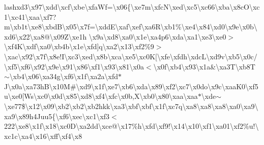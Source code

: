 lash{}xd3\textbackslash{}x97\textbackslash{}xdd\textbackslash{}xcf\textbackslash{}xbe\textbackslash{}xfa\+Wf=\textbackslash{}x06\{\textbackslash{}xe7m\textbackslash{}xfc\+N\textbackslash{}xed\textbackslash{}xc5\textbackslash{}xc66\textbackslash{}xba\textbackslash{}x8c\+O\textbackslash{}xc1\textbackslash{}xc41\textbackslash{}xaa\textbackslash{}xf7?m\textbackslash{}xb1t\textbackslash{}xe8\textbackslash{}xbd\+B\textbackslash{}x05\textbackslash{}x7f=\textbackslash{}xdd\+E\textbackslash{}xaf\textbackslash{}xef\textbackslash{}xa6\+R\textbackslash{}xb1\%\textbackslash{}xe4\textbackslash{}x84\textbackslash{}xd0\textbackslash{}x9e\textbackslash{}x0b\textbackslash{}xd6\textbackslash{}x22\textbackslash{}xa8@\textbackslash{}x09\+Z\textbackslash{}xe1h\textquotesingle{} \textbackslash{}x9a\textbackslash{}xd8\textbackslash{}xa0\textbackslash{}x1e\textbackslash{}xa4p6\textbackslash{}xda\textbackslash{}xa1\textbackslash{}xe3\textbackslash{}xe0$>$\textbackslash{}xf4\+K\textbackslash{}xdf\textbackslash{}xa0\textbackslash{}xb4b\textbackslash{}x1e\textbackslash{}xfd\mbox{]}q\textbackslash{}xa2\textbackslash{}x13\textbackslash{}xf2\%9$>$\textbackslash{}xac\textbackslash{}x92\textbackslash{}x7f\textbackslash{}x8e!\+I\textbackslash{}xc3\textbackslash{}xed\textbackslash{}x8b\textbackslash{}xca\textbackslash{}xe5\textbackslash{}xc0\+K\mbox{[}\textbackslash{}xfe\textbackslash{}xfdh\textbackslash{}xdc\+L\textbackslash{}xd9v\textbackslash{}xb5\textbackslash{}x0c/\textbackslash{}xf5\textbackslash{}xf6\textbackslash{}x92\textbackslash{}x9e\textbackslash{}x91\textbackslash{}x86\textbackslash{}xf1\textbackslash{}x93\textbackslash{}x81\textbackslash{}x0a$<$\textbackslash{}x0f\textbackslash{}xb4\textbackslash{}x93\textbackslash{}x1a\&\textbackslash{}xa3\+T\textbackslash{}xb8\+T$\sim$\textbackslash{}xb4\textbackslash{}x06\textbackslash{}xa34g\textbackslash{}xf6\textbackslash{}x1f\textbackslash{}xa2a\textbackslash{}xfd$\ast$\+J\textbackslash{}x0a\textbackslash{}xa73h\+B\textbackslash{}x10\+M\#\textbackslash{}xd9\textbackslash{}x1f\textbackslash{}xe7\textbackslash{}xb6\textbackslash{}xda\textbackslash{}x89\textbackslash{}xf2\textbackslash{}xc7\textbackslash{}x0do\textbackslash{}x9c\textbackslash{}xaa\+K0\textbackslash{}xf5u\textbackslash{}xe0\mbox{[}\+Ws\textbackslash{}xc0\textbackslash{}x0d\textbackslash{}x85\textbackslash{}xd8\textbackslash{}xf4\textbackslash{}xfc\textbackslash{}x0b,\+X\textbackslash{}xb0\textbackslash{}x80\textbackslash{}xaa\textbackslash{}xaa$\ast$\textbackslash{}xde$\sim$\textbackslash{}xe77\$\textbackslash{}x12\textbackslash{}x09\textbackslash{}xb2\textbackslash{}xb2\textbackslash{}xb2hkk\textbackslash{}xa3\textbackslash{}xbf\textbackslash{}xbf\textbackslash{}x1f\textbackslash{}xc7q\textbackslash{}xa8\textbackslash{}xa8\textbackslash{}xa8\textbackslash{}xa0\textbackslash{}xa9\textbackslash{}xa9\textbackslash{}x89h4\+Juu5\{\textbackslash{}xf6\textbackslash{}xec\textbackslash{}xc1\textbackslash{}xf3$<$222\textbackslash{}xe8\textbackslash{}x1f\textbackslash{}x18\textbackslash{}xc0\+D\textbackslash{}xa2dd\textbackslash{}xce@\textbackslash{}x17\%h\textbackslash{}xfd\textbackslash{}xf9!\textbackslash{}x14\textbackslash{}x10\textbackslash{}xf1\textbackslash{}xa01\textbackslash{}xf2\%u!\textbackslash{}xc1c\textbackslash{}xa4\textbackslash{}x16\textbackslash{}xff\textbackslash{}xf4\textbackslash{}x8